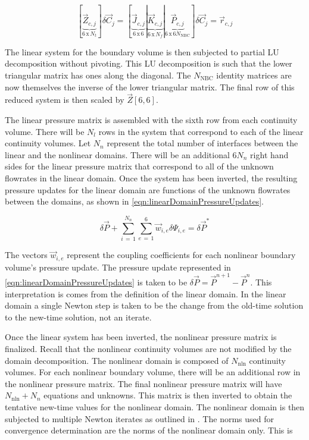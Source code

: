 \begin{equation}
\label{eqn:nbcLinSystem}
\left[\right.\underbrace{\vec{Z}_{c, j}}_{6\, \text{x}\, N_{t}}\left.\right] \delta \vec{C}_{j} = \left[\right.\underbrace{\vec{J}_{c, j}}_{6\, \text{x}\, 6}|\underbrace{\vec{K}_{c, j}}_{6\, \text{x}\, N_{f}}|{\underbrace{\vec{P}_{c, j}}_{6\, \text{x}\, 6 N_{\text{NBC}}}}\left.\right]\delta \vec{C}_{j} = \vec{r}_{c,j}
\end{equation}

The linear system for the boundary volume is then subjected to partial LU decomposition without pivoting.
This LU decomposition is such that the lower triangular matrix has ones along the diagonal.
The $N_{\text{NBC}}$ identity matrices are now themselves the inverse of the lower triangular matrix.
The final row of this reduced system is then scaled by $\vec{Z}[6,6]$.

The linear pressure matrix is assembled with the sixth row from each continuity volume.
There will be $N_{l}$ rows in the system that correspond to each of the linear continuity volumes.
Let $N_{n}$ represent the total number of interfaces between the linear and the nonlinear domains.
There will be an additional $6 N_{n}$ right hand sides for the linear pressure matrix that correspond to all of the unknown flowrates in the linear domain.
Once the system has been inverted, the resulting pressure updates for the linear domain are functions of the unknown flowrates between the domains, as shown in \eqref{eqn:linearDomainPressureUpdates}.

\begin{equation}
\label{eqn:linearDomainPressureUpdates}
\delta \vec{P} + \sum_{i\,=\,1}^{N_{n}} \sum_{e\,=\,1}^{6} \vec{w}_{i, e} \delta \Psi_{i, e} = \delta \vec{P}^{*} 
\end{equation}

The vectors $\vec{w}_{i, e}$ represent the coupling coefficients for each nonlinear boundary volume's pressure update.
The pressure update represented in \eqref{eqn:linearDomainPressureUpdates} is taken to be $\delta \vec{P} = \vec{P}^{n+1} - \vec{P}^{n}$.
This interpretation is comes from the definition of the linear domain.
In the linear domain a single Newton step is taken to be the change from the old-time solution to the new-time solution, not an iterate.

Once the linear system has been inverted, the nonlinear pressure matrix is finalized.
Recall that the nonlinear continuity volumes are not modified by the domain decomposition.
The nonlinear domain is composed of $N_{\text{nln}}$ continuity volumes.
For each nonlinear boundary volume, there will be an additional row in the nonlinear pressure matrix.
The final nonlinear pressure matrix will have $N_{\text{nln}} + N_{n}$ equations and unknowns.
This matrix is then inverted to obtain the tentative new-time values for the nonlinear domain.
The nonlinear domain is then subjected to multiple Newton iterates as outlined in .
The norms used for convergence determination are the norms of the nonlinear domain only.
This is

